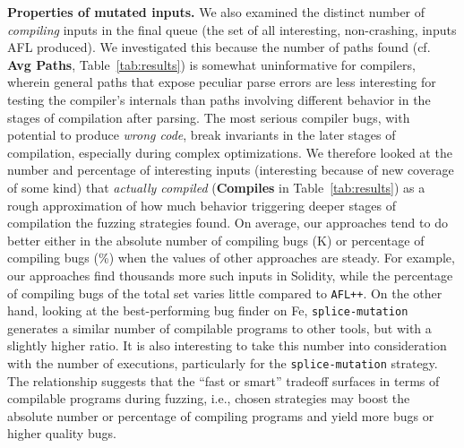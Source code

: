 \textbf{Properties of mutated inputs.} We also examined the distinct number of
\emph{compiling} inputs in the final queue (the set of all interesting,
non-crashing, inputs AFL produced).  We investigated this because the number of
paths found (cf. \textbf{Avg Paths}, Table~\ref{tab:results}) is somewhat
uninformative for compilers, wherein general paths that expose peculiar parse
errors are less interesting for testing the compiler's internals than paths
involving different behavior in the stages of compilation after parsing.  The
most serious compiler bugs, with potential to produce \emph{wrong code}, break
invariants in the later stages of compilation, especially during complex
optimizations.  We therefore looked at the number and percentage of interesting
inputs (interesting because of new coverage of some kind) that \emph{actually
compiled} (\textbf{Compiles} in Table~\ref{tab:results}) as a rough
approximation of how much behavior triggering deeper stages of compilation the
fuzzing strategies found. On average, our approaches tend to do better either
in the absolute number of compiling bugs (K) or percentage of compiling bugs
(\%) when the values of other approaches are steady. For example, our approaches
find thousands more such inputs in Solidity, while the percentage of compiling
bugs of the total set varies little compared to \texttt{AFL++}. On the other hand,
looking at the best-performing bug finder on Fe, \texttt{splice-mutation}
generates a similar number of compilable programs to other tools, but with a slightly
higher ratio. It is also interesting to take this number into consideration
with the number of executions, particularly for the \texttt{splice-mutation}
strategy. The relationship suggests that the ``fast or smart'' tradeoff surfaces in terms of
compilable programs during fuzzing, i.e., chosen strategies may boost the
absolute number or percentage of compiling programs and yield more
bugs or higher quality bugs.
